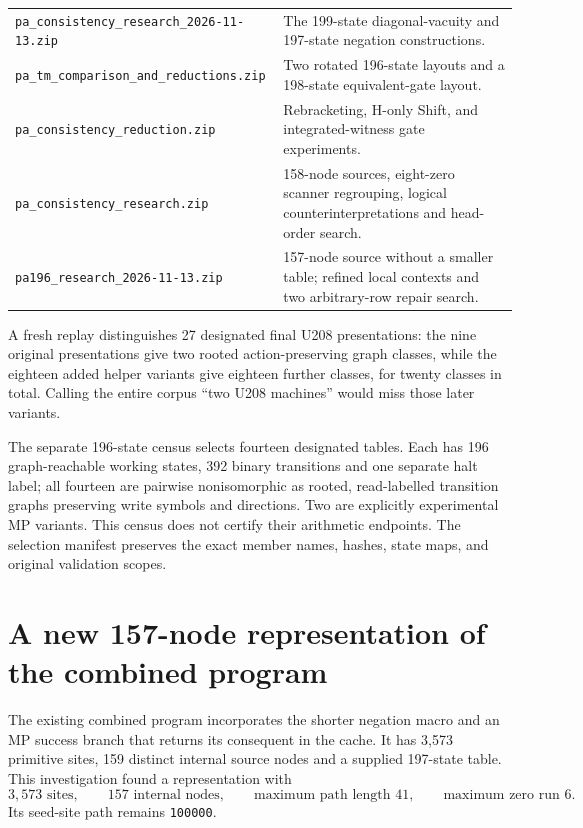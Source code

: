 \documentclass[11pt,letterpaper]{article}
\newcommand{\file}[1]{\texttt{\nolinkurl{#1}}}
\begin{document}
\begin{longtable}{@{}p{5.9cm}p{8.0cm}@{}}
\file{pa_consistency_research_2026-11-13.zip} & The 199-state diagonal-vacuity and 197-state negation constructions.\\
\file{pa_tm_comparison_and_reductions.zip} & Two rotated 196-state layouts and a 198-state equivalent-gate layout.\\
\file{pa_consistency_reduction.zip} & Rebracketing, H-only Shift, and integrated-witness gate experiments.\\
\file{pa_consistency_research.zip} & 158-node sources, eight-zero scanner regrouping, logical counterinterpretations and head-order search.\\
\file{pa196_research_2026-11-13.zip} & 157-node source without a smaller table; refined local contexts and two arbitrary-row repair search.\\
\bottomrule
\end{longtable}
\normalsize

A fresh replay distinguishes 27 designated final U208 presentations:
the nine original presentations give two rooted action-preserving graph
classes, while the eighteen added helper variants give eighteen further
classes, for twenty classes in total. Calling the entire corpus ``two
U208 machines'' would miss those later variants.

The separate 196-state census selects fourteen designated tables. Each has
196 graph-reachable working states, 392 binary transitions and one separate
halt label; all fourteen are pairwise nonisomorphic as rooted, read-labelled
transition graphs preserving write symbols and directions. Two are explicitly
experimental MP variants. This census does not certify their arithmetic
endpoints. The selection manifest preserves the exact member names, hashes,
state maps, and original validation scopes.

\section{A new 157-node representation of the combined program}

The existing combined program incorporates the shorter negation macro and
an MP success branch that returns its consequent in the cache. It has
3,573 primitive sites, 159 distinct internal source nodes and a supplied
197-state table. This investigation found a representation with
\[
 3,573\text{ sites},\qquad157\text{ internal nodes},\qquad
 \text{maximum path length }41,\qquad\text{maximum zero run }6.
\]
Its seed-site path remains \texttt{100000}.
\end{document}
